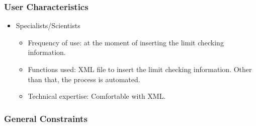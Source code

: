 \subsubsection{User Characteristics}

\begin{itemize}
\item Specialists/Scientists
\begin{itemize}
\item Frequency of use: at the moment of inserting the limit checking information.
\item Functions used: XML file to insert the limit checking information. Other than that, the process is automated.
\item Technical expertise: Comfortable with XML.
\end{itemize}
\end{itemize}


\subsubsection{General Constraints}


